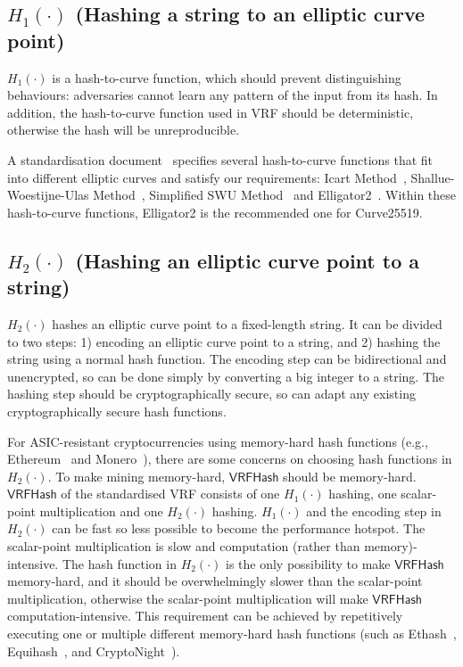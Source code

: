 \documentclass[sigconf]{acmart}
\begin{document}
\subsection{$H_{1}(\cdot)$ (Hashing a string to an elliptic curve point)}

$H_{1}(\cdot)$ is a hash-to-curve function, which should prevent distinguishing behaviours: adversaries cannot learn any pattern of the input from its hash.
In addition, the hash-to-curve function used in VRF should be deterministic, otherwise the hash will be unreproducible.

A standardisation document~\cite{scott2019hashing} specifies several hash-to-curve functions that fit into different elliptic curves and satisfy our requirements: Icart Method~\cite{icart2009hash}, Shallue-Woestijne-Ulas Method~\cite{ulas2007rational}, Simplified SWU Method~\cite{brier2010efficient} and Elligator2~\cite{bernstein2013elligator}.
Within these hash-to-curve functions, Elligator2 is the recommended one for Curve25519.




\subsection{$H_{2}(\cdot)$ (Hashing an elliptic curve point to a string)}

$H_{2}(\cdot)$ hashes an elliptic curve point to a fixed-length string.
It can be divided to two steps: 1) encoding an elliptic curve point to a string, and 2) hashing the string using a normal hash function.
The encoding step can be bidirectional and unencrypted, so can be done simply by converting a big integer to a string.
The hashing step should be cryptographically secure, so can adapt any existing cryptographically secure hash functions.

For ASIC-resistant cryptocurrencies using memory-hard hash functions (e.g., Ethereum~\cite{wood2014ethereum} and Monero~\cite{monero}), there are some concerns on choosing hash functions in $H_{2}(\cdot)$.
To make mining memory-hard, $\mathsf{VRFHash}$ should be memory-hard.
$\mathsf{VRFHash}$ of the standardised VRF consists of one $H_{1}(\cdot)$ hashing, one scalar-point multiplication and one $H_{2}(\cdot)$ hashing.
$H_{1}(\cdot)$ and the encoding step in $H_{2}(\cdot)$ can be fast so less possible to become the performance hotspot.
The scalar-point multiplication is slow and computation (rather than memory)-intensive.
The hash function in $H_{2}(\cdot)$ is the only possibility to make $\mathsf{VRFHash}$ memory-hard, and it should be overwhelmingly slower than the scalar-point multiplication, otherwise the scalar-point multiplication will make $\mathsf{VRFHash}$ computation-intensive.
This requirement can be achieved by repetitively executing one or multiple different memory-hard hash functions (such as Ethash~\cite{wiki2017ethash}, Equihash~\cite{biryukov2017equihash}, and CryptoNight~\cite{seigenneocortex}).
\end{document}
